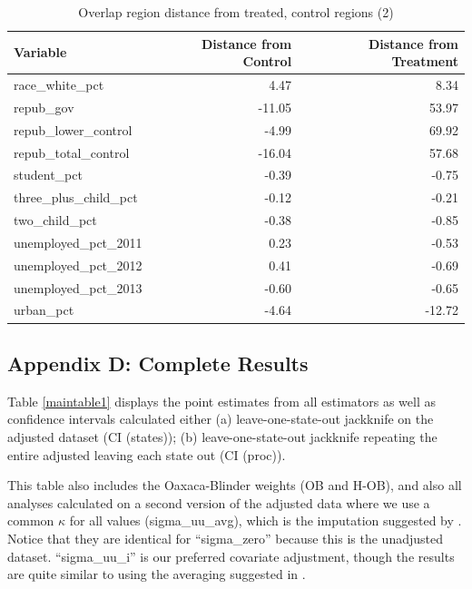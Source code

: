 \documentclass[12pt]{article}
\begin{document}
\begin{table}[ht]
\centering
\begin{tabular}{lrr}
  \hline
Variable & Distance from Control & Distance from Treatment \\ 
  \hline
  race\_white\_pct & 4.47 & 8.34 \\ 
  repub\_gov & -11.05 & 53.97 \\ 
  repub\_lower\_control & -4.99 & 69.92 \\ 
  repub\_total\_control & -16.04 & 57.68 \\ 
  student\_pct & -0.39 & -0.75 \\ 
  three\_plus\_child\_pct & -0.12 & -0.21 \\ 
  two\_child\_pct & -0.38 & -0.85 \\ 
  unemployed\_pct\_2011 & 0.23 & -0.53 \\ 
  unemployed\_pct\_2012 & 0.41 & -0.69 \\ 
  unemployed\_pct\_2013 & -0.60 & -0.65 \\ 
  urban\_pct & -4.64 & -12.72 \\ 
   \hline
\end{tabular}
\caption{Overlap region distance from treated, control regions (2)}
\label{oatedist2}
\end{table}

\subsection{Appendix D: Complete Results}

Table \ref{maintable1} displays the point estimates from all estimators as well as confidence intervals calculated either (a) leave-one-state-out jackknife on the adjusted dataset (CI (states)); (b) leave-one-state-out jackknife repeating the entire adjusted leaving each state out (CI (proc)). 

This table also includes the Oaxaca-Blinder weights (OB and H-OB), and also all analyses calculated on a second version of the adjusted data where we use a common $\kappa$ for all values (sigma\_uu\_avg), which is the imputation suggested by \cite{carroll2006measurement}. Notice that they are identical for ``sigma\_zero'' because this is the unadjusted dataset. ``sigma\_uu\_i'' is our preferred covariate adjustment, though the results are quite similar to using the averaging suggested in \cite{gleser1992importance}.
\end{document}
